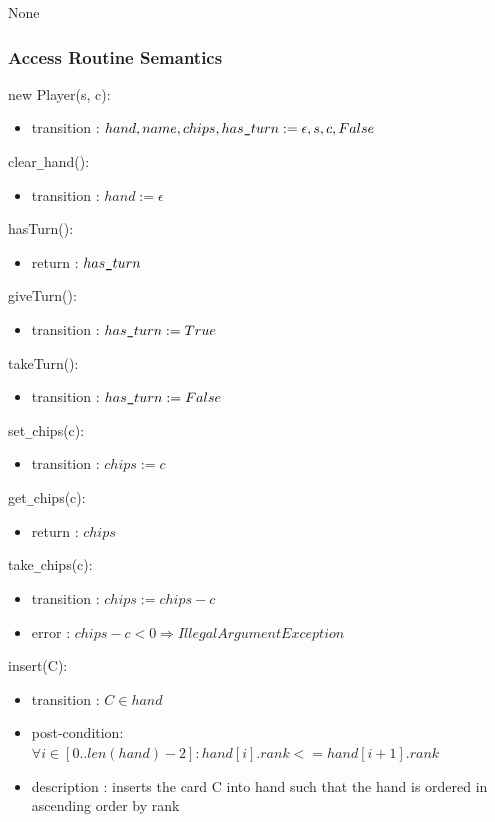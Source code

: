 \documentclass[12pt, titlepage]{article}
\begin{document}
None

\subsubsection* {Access Routine Semantics}

\noindent new Player(s, c):
\begin{itemize}
\item transition : $hand, name, chips, has\verb|_|turn := \epsilon, s, c, False$ 
\end{itemize}

\noindent clear\verb|_|hand():
\begin{itemize}
\item transition : $hand := \epsilon$ 
\end{itemize}

\noindent hasTurn():
\begin{itemize}
\item return : $has\verb|_|turn$ 
\end{itemize}

\noindent giveTurn():
\begin{itemize}
\item transition : $has\verb|_|turn := True$ 
\end{itemize}

\noindent takeTurn():
\begin{itemize}
\item transition : $has\verb|_|turn := False$ 
\end{itemize}

\noindent set\verb|_|chips(c):
\begin{itemize}
\item transition : $chips := c$ 
\end{itemize}

\noindent get\verb|_|chips(c):
\begin{itemize}
\item return : $chips$ 
\end{itemize}

\noindent take\verb|_|chips(c):
\begin{itemize}
\item transition : $chips := chips - c$
\item error : $chips - c < 0 \Longrightarrow IllegalArgumentException$
\end{itemize}

\noindent insert(C):
\begin{itemize}
\item transition : $C \in hand$
\item post-condition: $\forall i \in [0..len(hand) - 2] : hand[i].rank <= hand[i+1].rank$ 
\item description : inserts the card C into hand such that the hand is ordered in ascending order by rank
\end{itemize}
\end{document}

